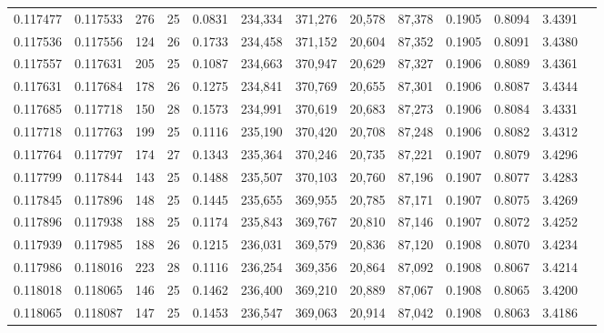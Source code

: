 \begin{tabular}{rrrrrrrrrrrrr}
0.117477 & 0.117533 & 276 &  25 &                                     0.0831 & 234,334 & 371,276 &  20,578 &  87,378 & 0.1905 & 0.8094 & 3.4391 \\
0.117536 & 0.117556 & 124 &  26 &                                     0.1733 & 234,458 & 371,152 &  20,604 &  87,352 & 0.1905 & 0.8091 & 3.4380 \\
0.117557 & 0.117631 & 205 &  25 &                                     0.1087 & 234,663 & 370,947 &  20,629 &  87,327 & 0.1906 & 0.8089 & 3.4361 \\
0.117631 & 0.117684 & 178 &  26 &                                     0.1275 & 234,841 & 370,769 &  20,655 &  87,301 & 0.1906 & 0.8087 & 3.4344 \\
0.117685 & 0.117718 & 150 &  28 &                                     0.1573 & 234,991 & 370,619 &  20,683 &  87,273 & 0.1906 & 0.8084 & 3.4331 \\
0.117718 & 0.117763 & 199 &  25 &                                     0.1116 & 235,190 & 370,420 &  20,708 &  87,248 & 0.1906 & 0.8082 & 3.4312 \\
0.117764 & 0.117797 & 174 &  27 &                                     0.1343 & 235,364 & 370,246 &  20,735 &  87,221 & 0.1907 & 0.8079 & 3.4296 \\
0.117799 & 0.117844 & 143 &  25 &                                     0.1488 & 235,507 & 370,103 &  20,760 &  87,196 & 0.1907 & 0.8077 & 3.4283 \\
0.117845 & 0.117896 & 148 &  25 &                                     0.1445 & 235,655 & 369,955 &  20,785 &  87,171 & 0.1907 & 0.8075 & 3.4269 \\
0.117896 & 0.117938 & 188 &  25 &                                     0.1174 & 235,843 & 369,767 &  20,810 &  87,146 & 0.1907 & 0.8072 & 3.4252 \\
0.117939 & 0.117985 & 188 &  26 &                                     0.1215 & 236,031 & 369,579 &  20,836 &  87,120 & 0.1908 & 0.8070 & 3.4234 \\
0.117986 & 0.118016 & 223 &  28 &                                     0.1116 & 236,254 & 369,356 &  20,864 &  87,092 & 0.1908 & 0.8067 & 3.4214 \\
0.118018 & 0.118065 & 146 &  25 &                                     0.1462 & 236,400 & 369,210 &  20,889 &  87,067 & 0.1908 & 0.8065 & 3.4200 \\
0.118065 & 0.118087 & 147 &  25 &                                     0.1453 & 236,547 & 369,063 &  20,914 &  87,042 & 0.1908 & 0.8063 & 3.4186 \\

\end{tabular}
